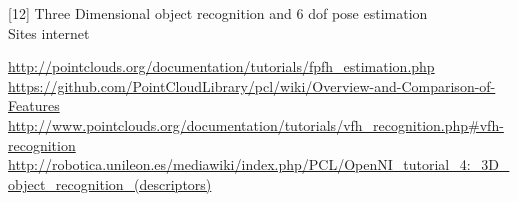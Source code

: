 [12] Three Dimensional object recognition and 6 dof pose estimation \\ 


Sites internet

\url{http://pointclouds.org/documentation/tutorials/fpfh_estimation.php} \\

\url{https://github.com/PointCloudLibrary/pcl/wiki/Overview-and-Comparison-of-Features} \\

\url{http://www.pointclouds.org/documentation/tutorials/vfh_recognition.php#vfh-recognition} \\

\url{http://robotica.unileon.es/mediawiki/index.php/PCL/OpenNI_tutorial_4:_3D_object_recognition_(descriptors)}

